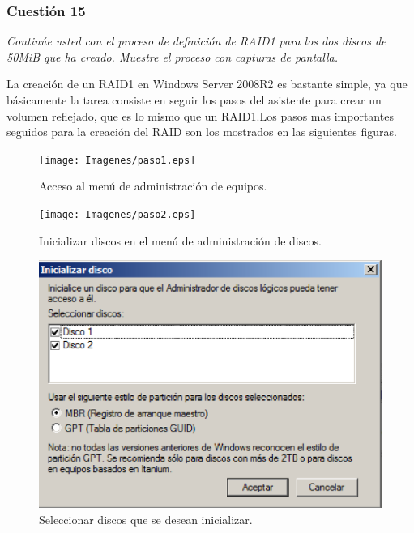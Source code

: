 \subsubsection{Cuestión 15}
\textit{Continúe usted con el proceso de definición de RAID1 para los dos discos de 50MiB que ha creado. Muestre el proceso con capturas de pantalla.}\newline

La creación de un RAID1 en Windows Server 2008R2 es bastante simple, ya que básicamente la tarea consiste en seguir los pasos del asistente para crear un volumen reflejado, que es lo mismo que un RAID1.Los pasos mas importantes seguidos para la creación del RAID son los mostrados en las siguientes figuras.

\begin{figure}[H]
    \begin{center}
    \advance\leftskip-2.3cm
        \texttt{[image: Imagenes/paso1.eps]}
        \caption{Acceso al menú de administración de equipos.}
        \label{fig10}
    \end{center}
\end{figure}

\begin{figure}[H]
    \begin{center}
    \advance\leftskip-2cm
        \texttt{[image: Imagenes/paso2.eps]}
        \caption{Inicializar discos en el menú de administración de discos.}
        \label{fig11}
    \end{center}
\end{figure}

\begin{figure}[H]
    \begin{center}
        \includegraphics[scale=0.7]{Imagenes/paso3.eps}
        \caption{Seleccionar discos que se desean inicializar.}
        \label{fig12}
    \end{center}
\end{figure}

